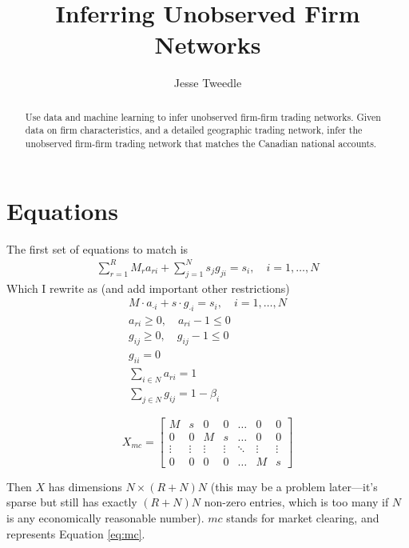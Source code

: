 \documentclass[11pt]{article}
\begin{document}
\title{Inferring Unobserved Firm Networks}
\author{Jesse Tweedle}
\date{}


 \maketitle

\begin{abstract}

Use data and machine learning to infer unobserved firm-firm trading networks. Given data on firm characteristics, and a detailed geographic trading network, infer the unobserved firm-firm trading network that matches the Canadian national accounts.

\end{abstract}

\section{Equations}

The first set of equations to match is 
\begin{gather}
\sum_{r=1}^R M_r a_{ri} + \sum_{j=1}^N s_j g_{ji} = s_i , \quad i = 1,\ldots, N
\end{gather}
Which I rewrite as (and add important other restrictions)
\begin{gather}
\label{eq:mc}
M \cdot a_{\cdot i} + s \cdot g_{\cdot i} = s_i, \quad i = 1,\ldots, N \\
a_{ri} \geq 0, \quad a_{ri} - 1 \leq 0 \\
g_{ij} \geq 0, \quad g_{ij} - 1\leq 0 \\
g_{ii} = 0 \\
\sum_{i \in N} a_{ri} = 1 \label{eq:rowsuma}\\
\sum_{j \in N} g_{ij} = 1-\beta_i\label{eq:rowsumg}
\end{gather}

\[
X_{mc} = 
\begin{bmatrix}
    M & s &  0 & 0 & \dots  & 0 & 0\\
    0 & 0 & M & s &\dots  & 0 & 0 \\
    \vdots & \vdots & \vdots & \vdots & \ddots & \vdots & \vdots  \\
    0 & 0 & 0 & 0 & \dots  & M & s
\end{bmatrix}
\]

Then $X$ has dimensions $N \times (R+N)N$ (this may be a problem later---it's sparse but still has exactly $(R+N)N$ non-zero entries, which is too many if $N$ is any economically reasonable number). $mc$ stands for market clearing, and represents Equation \eqref{eq:mc}.
\end{document}
